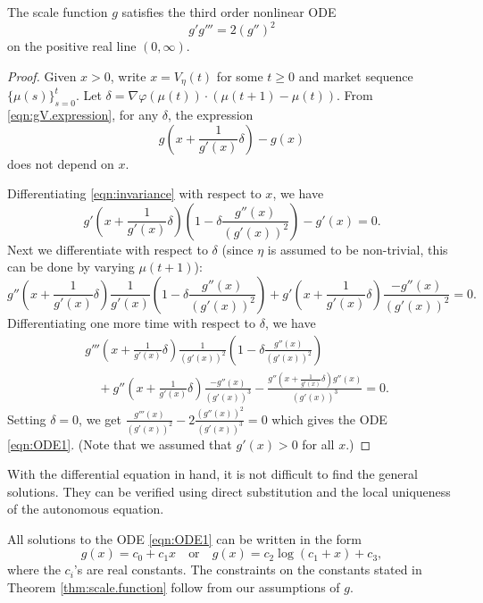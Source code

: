 \documentclass[graybox]{svmult}
\begin{document}
\begin{lemma} 
The scale function $g$ satisfies the third order nonlinear ODE
\begin{equation} \label{eqn:ODE1}
g' g''' =2  (g'')^2
\end{equation}
on the positive real line $(0, \infty)$.
\end{lemma}
\begin{proof}
Given $x > 0$, write $x = V_{\eta}(t)$ for some $t \geq 0$ and market sequence $\{\mu(s)\}_{s = 0}^t$. Let $\delta =  \nabla \varphi(\mu(t)) \cdot ( \mu(t + 1) - \mu(t) )$. From \eqref{eqn:gV.expression}, for any $\delta$, the expression
\begin{equation} \label{eqn:invariance}
g(x + \frac{1}{g'(x)} \delta) - g(x)
\end{equation}
does not depend on $x$.

Differentiating \eqref{eqn:invariance} with respect to $x$, we have
\[
g'(x + \frac{1}{g'(x)}\delta) \left(1 - \delta \frac{g''(x)}{(g'(x))^2}\right) - g'(x) = 0.
\]
Next we differentiate with respect to $\delta$ (since $\eta$ is assumed to be non-trivial, this can be done by varying $\mu(t + 1)$):
\[
g''(x + \frac{1}{g'(x)} \delta) \frac{1}{g'(x)} \left(1 - \delta \frac{g''(x)}{(g'(x))^2}\right) + g'(x + \frac{1}{g'(x)} \delta) \frac{- g''(x)}{(g'(x))^2} = 0.
\]
Differentiating one more time with respect to $\delta$, we have
\begin{equation*}
\begin{split}
& g'''(x + \frac{1}{g'(x)}\delta) \frac{1}{(g'(x))^2} \left(1 - \delta \frac{g''(x)}{(g'(x))^2}\right)\\
&\quad + g''(x + \frac{1}{g'(x)} \delta) \frac{-g''(x)}{(g'(x))^3} - \frac{g''(x + \frac{1}{g'(x)} \delta) g''(x)}{(g'(x))^3} = 0.
\end{split}
\end{equation*}
Setting $\delta = 0$, we get $\frac{g'''(x)}{(g'(x))^2} - 2 \frac{(g''(x))^2}{(g'(x))^3} = 0$ which gives the ODE \eqref{eqn:ODE1}. (Note that we assumed that $g'(x) > 0$ for all $x$.)
\end{proof}

With the differential equation in hand, it is not difficult to find the general solutions. They can be verified using direct substitution and the local uniqueness of the autonomous equation.

\begin{lemma} \label{lem:ODE.solution}
All solutions to the ODE \eqref{eqn:ODE1} can be written in the form
\begin{equation} \label{eqn:g.equation}
g(x) = c_0 + c_1 x  \quad \text{or} \quad  g(x) = c_2 \log (c_1 + x) + c_3,
\end{equation}
where the $c_i$'s are real constants. The constraints on the constants stated in Theorem \ref{thm:scale.function} follow from our assumptions of $g$.
\end{lemma}
\end{document}
